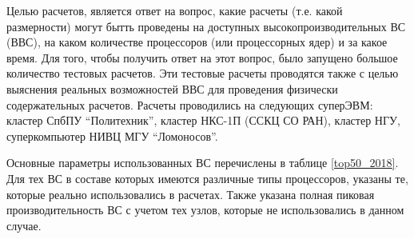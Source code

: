 Целью расчетов,  является ответ на вопрос, какие расчеты (т.е. какой размерности) могут бытть проведены на доступных высокопроизводительных  ВС (ВВС), на каком количестве процессоров (или процессорных ядер) и за какое время. 
Для того, чтобы получить ответ на этот вопрос, было запущено большое количество тестовых расчетов. Эти тестовые расчеты проводятся также с целью выяснения реальных возможностей ВВС для проведения физически содержательных расчетов. 	Расчеты проводились на следующих суперЭВМ: кластер СпбПУ “Политехник”, кластер НКС-1П (ССКЦ СО РАН), кластер НГУ,  суперкомпьютер НИВЦ МГУ “Ломоносов”. 

Основные параметры использованных ВС перечислены в таблице \ref{top50_2018}. Для тех ВС в составе которых имеются различные типы процессоров, указаны те, которые реально использовались в расчетах. Также указана полная пиковая производительность ВС с учетом тех узлов, которые не использовались в данном случае.

